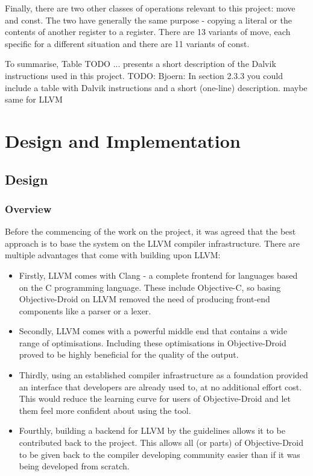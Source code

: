 \documentclass[parskip]{cs4rep}
\begin{document}
Finally, there are two other classes of operations relevant to this project: move and const. The two have generally the same purpose - copying a literal or the contents of another register to a register. There are 13 variants of move, each specific for a different situation and there are 11 variants of const.

To summarise, Table TODO ... presents a short description of the Dalvik instructions used in this project. 
TODO: Bjoern: In section 2.3.3 you could include a table with Dalvik instructions and a short (one-line) description. maybe same for LLVM

\chapter{Design and Implementation}

\section{Design}

\subsection{Overview}

Before the commencing of the work on the project, it was agreed that the best approach is to base the system on the LLVM compiler infrastructure. There are multiple advantages that come with building upon LLVM:
\begin{itemize}
\item
Firstly, LLVM comes with Clang - a complete frontend for languages based on the C programming language. These include Objective-C, so basing Objective-Droid on LLVM removed the need of producing front-end components like a parser or a lexer.
\item
Secondly, LLVM comes with a powerful middle end that contains a wide range of optimisations\cite{P7}. Including these optimisations in Objective-Droid proved to be highly beneficial for the quality of the output. 
\item
Thirdly, using an established compiler infrastructure as a foundation provided an interface that developers are already used to, at no additional effort cost. This would reduce the learning curve for users of Objective-Droid and let them feel more confident about using the tool.
\item
Fourthly, building a backend for LLVM by the guidelines allows it to be contributed back to the project. This allows all (or parts) of Objective-Droid to be given back to the compiler developing community easier than if it was being developed from scratch.
\end{itemize}
\end{document}
